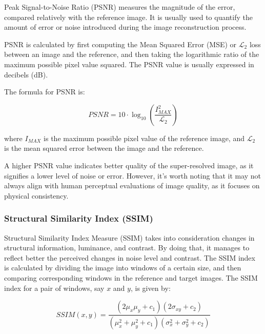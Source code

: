          
            Peak Signal-to-Noise Ratio (PSNR) measures the magnitude of the error, compared relatively with the reference image. It is usually used to quantify the amount of error or noise introduced during the image reconstruction process.
            
            PSNR is calculated by first computing the Mean Squared Error (MSE) or $\mathcal{L}_2$ loss between an image and the reference, and then taking the logarithmic ratio of the maximum possible pixel value squared. The PSNR value is usually expressed in decibels (dB).
            
            The formula for PSNR is:
            
            \begin{equation}
            PSNR = 10 \cdot \log_{10} \left( \frac{I_{MAX}^{2}}{\mathcal{L}_2} \right)
            \end{equation}
            
            where $I_{MAX}$ is the maximum possible pixel value of the reference image, and $\mathcal{L}_2$ is the mean squared error between the image and the reference.
            
            A higher PSNR value indicates better quality of the super-resolved image, as it signifies a lower level of noise or error. However, it's worth noting that it may not always align with human perceptual evaluations of image quality, as it focuses on physical consistency.

        \subsubsection{Structural Similarity Index (SSIM)}

            
        Structural Similarity Index Measure (SSIM) takes into consideration changes in structural information, luminance, and contrast. By doing that, it manages to reflect better the perceived changes in noise level and contrast.
        The SSIM index is calculated by dividing the image into windows of a certain size, and then comparing corresponding windows in the reference and target images. The SSIM index for a pair of windows, say $x$ and $y$, is given by:
        
        \begin{equation}
            SSIM(x, y) = \frac{(2\mu_x\mu_y + c_1)(2\sigma_{xy} + c_2)}{(\mu_x^2 + \mu_y^2 + c_1)(\sigma_x^2 + \sigma_y^2 + c_2)}
        \end{equation}
        
